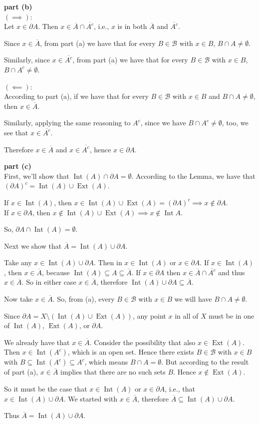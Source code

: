 \documentclass{homework}
\newcommand{\calB}{\mathcal{B}}
\DeclareMathOperator{\Int}{\mathrm{Int}}
\DeclareMathOperator{\Ext}{\mathrm{Ext}}
\begin{document}
\textbf{part (b)}\\
$(\implies)$:\\
Let $x\in\partial A$.  Then $x\in\overline{A}\cap\overline{A^c}$, i.e., $x$ is
in both $\overline{A}$ and $\overline{A^c}$.

Since $x\in\overline{A}$, from part (a) we have that for every $B\in\calB$ with
$x\in B$, $B\cap A\ne\emptyset$.

Similarly, since $x\in\overline{A^c}$, from part (a) we have that for every $B\in\calB$ with
$x\in B$, $B\cap A^c\ne\emptyset$.

$(\impliedby)$:\\
According to part (a), if we have that for every $B\in\calB$ with $x\in B$ and
$B\cap A\ne\emptyset$, then $x\in\overline{A}$.

Similarly, applying the same reasoning to $A^c$, since we have $B\cap A^c\ne\emptyset$, too,
we see that $x\in\overline{A^c}$.

Therefore $x\in\overline{A}$ and $x\in\overline{A^c}$, hence $x\in\partial A$.

\textbf{part (c)}\\
First, we'll show that $\Int(A) \cap \partial A = \emptyset$.  According to the
Lemma, we have that $(\partial A)^c = \Int (A) \cup \Ext(A)$.

If $x\in\Int(A)$, then
$x\in\Int(A)\cup\Ext(A)=(\partial A)^c \implies x\not\in \partial A$.\\
If $x\in \partial A$, then $x\not\in\Int(A)\cup\Ext(A) \implies x\not\in\Int A$.

So, $\partial A \cap \Int(A) = \emptyset$.

Next we show that $\overline{A} = \Int(A) \cup \partial A$.

Take any $x\in \Int(A)\cup\partial A$.  Then in $x\in\Int(A)$ or
$x\in\partial A$.  If $x\in\Int(A)$, then $x\in\overline{A}$, because
$\Int(A)\subseteq A\subseteq \overline{A}$.  If $x\in\partial A$ then
$x\in \overline{A}\cap\overline{A^c}$ and thus $x\in \overline{A}$.
So in either case $x\in\overline{A}$, therefore
$\Int(A)\cup\partial A\subseteq\overline{A}$.

Now take $x\in\overline{A}$.  So, from (a), every $B\in\calB$ with $x\in B$
we will have $B\cap A\ne\emptyset$.

Since $\partial A = X \setminus (\Int(A) \cup \Ext(A))$, any point $x$ in all
of $X$ must be in one of $\Int(A)$, $\Ext(A)$, or $\partial A$.

We already have that $x\in\overline{A}$.  Consider the possibility that also
$x\in\Ext(A)$.  Then $x\in\Int(A^c)$, which is an open set. Hence
there exists $B\in\calB$ with $x\in B$ with $B\subseteq \Int(A^c)\subseteq A^c$,
which means $B\cap A=\emptyset$.  But according to the result of part (a), 
$x\in\overline{A}$ implies that there are no such sets $B$.  Hence $x\not\in\Ext(A)$.

So it must be the case that $x\in\Int(A)$ or $x\in\partial A$,
i.e., that $x\in\Int(A)\cup\partial A$.  We started with $x\in\overline{A}$, therefore
$\overline{A}\subseteq\Int(A)\cup\partial A$.

Thus $\overline{A} = \Int(A)\cup \partial A$.
\end{document}
